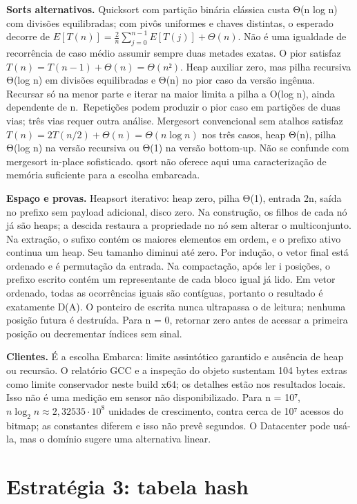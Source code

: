 \documentclass[
  brazilian,
  11pt,
  a4paper,
]{article}
\let\oldsection\section
\renewcommand{\section}{\Needspace{6\baselineskip}\oldsection}
\begin{document}
\textbf{Sorts alternativos.} Quicksort com partição binária clássica
custa Θ(n log n) com divisões equilibradas; com pivôs uniformes e chaves
distintas, o esperado decorre de
\(E[T(n)]=\frac2n\sum_{j=0}^{n-1}E[T(j)]+\Theta(n)\). Não é uma
igualdade de recorrência de caso médio assumir sempre duas metades
exatas. O pior satisfaz \(T(n)=T(n-1)+\Theta(n)=\Theta(n²)\). Heap
auxiliar zero, mas pilha recursiva Θ(log n) em divisões equilibradas e
Θ(n) no pior caso da versão ingênua. Recursar só na menor parte e iterar
na maior limita a pilha a O(log n), ainda dependente de n.~Repetições
podem produzir o pior caso em partições de duas vias; três vias requer
outra análise. Mergesort convencional sem atalhos satisfaz
\(T(n)=2T(n/2)+\Theta(n)=\Theta(n\log n)\) nos três casos, heap Θ(n),
pilha Θ(log n) na versão recursiva ou Θ(1) na versão bottom-up. Não se
confunde com mergesort in-place sofisticado. qsort não oferece aqui uma
caracterização de memória suficiente para a escolha embarcada.

\textbf{Espaço e provas.} Heapsort iterativo: heap zero, pilha Θ(1),
entrada 2n, saída no prefixo sem payload adicional, disco zero. Na
construção, os filhos de cada nó já são heaps; a descida restaura a
propriedade no nó sem alterar o multiconjunto. Na extração, o sufixo
contém os maiores elementos em ordem, e o prefixo ativo continua um
heap. Seu tamanho diminui até zero. Por indução, o vetor final está
ordenado e é permutação da entrada. Na compactação, após ler i posições,
o prefixo escrito contém um representante de cada bloco igual já lido.
Em vetor ordenado, todas as ocorrências iguais são contíguas, portanto o
resultado é exatamente D(A). O ponteiro de escrita nunca ultrapassa o de
leitura; nenhuma posição futura é destruída. Para n = 0, retornar zero
antes de acessar a primeira posição ou decrementar índices sem sinal.

\textbf{Clientes.} É a escolha Embarca: limite assintótico garantido e
ausência de heap ou recursão. O relatório GCC e a inspeção do objeto
sustentam 104 bytes extras como limite conservador neste build x64; os
detalhes estão nos resultados locais. Isso não é uma medição em sensor
não disponibilizado. Para n = 10⁷, \(n\log_2 n\approx2,32535\cdot10^8\)
unidades de crescimento, contra cerca de 10⁷ acessos do bitmap; as
constantes diferem e isso não prevê segundos. O Datacenter pode usá-la,
mas o domínio sugere uma alternativa linear.

\section{Estratégia 3: tabela hash}\label{estratuxe9gia-3-tabela-hash}
\end{document}
